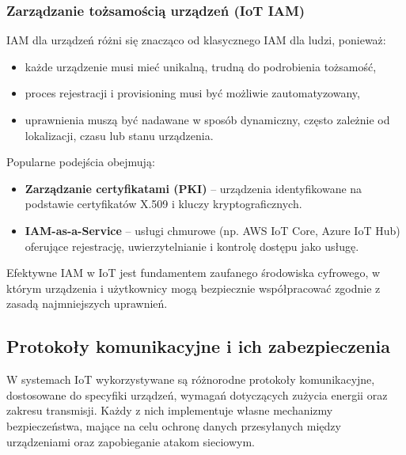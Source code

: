\subsubsection*{Zarządzanie tożsamością urządzeń (IoT IAM)}

IAM dla urządzeń różni się znacząco od klasycznego IAM dla ludzi, ponieważ:

\begin{itemize}
    \item każde urządzenie musi mieć unikalną, trudną do podrobienia tożsamość,
    
    \item proces rejestracji i provisioning musi być możliwie zautomatyzowany,
    
    \item uprawnienia muszą być nadawane w sposób dynamiczny, często zależnie od lokalizacji, czasu lub stanu urządzenia.
\end{itemize}

Popularne podejścia obejmują:
\begin{itemize}
    \item \textbf{Zarządzanie certyfikatami (PKI)} – urządzenia identyfikowane na podstawie certyfikatów X.509 i kluczy kryptograficznych.
    
    \item \textbf{IAM-as-a-Service} – usługi chmurowe (np. AWS IoT Core, Azure IoT Hub) oferujące rejestrację, uwierzytelnianie i kontrolę dostępu jako usługę.
\end{itemize}

Efektywne IAM w IoT jest fundamentem zaufanego środowiska cyfrowego, w którym urządzenia i użytkownicy mogą bezpiecznie współpracować zgodnie z zasadą najmniejszych uprawnień.

\subsection{Protokoły komunikacyjne i ich zabezpieczenia}

W systemach IoT wykorzystywane są różnorodne protokoły komunikacyjne, dostosowane do specyfiki urządzeń, wymagań dotyczących zużycia energii oraz zakresu transmisji. Każdy z nich implementuje własne mechanizmy bezpieczeństwa, mające na celu ochronę danych przesyłanych między urządzeniami oraz zapobieganie atakom sieciowym.

